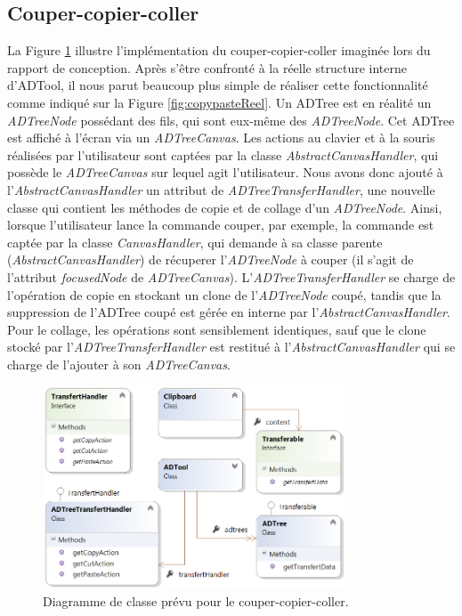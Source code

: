 	\subsection{Couper-copier-coller}
	La {\sc Figure} \ref{fig:copypastePrevu} illustre l'implémentation du couper-copier-coller imaginée lors du rapport de conception. Après s'être confronté à la réelle structure interne d'ADTool, il nous parut beaucoup plus simple de réaliser cette fonctionnalité comme indiqué sur la {\sc Figure} \ref{fig:copypasteReel}. Un ADTree est en réalité un \emph{ADTreeNode} possédant des fils, qui sont eux-même des \emph{ADTreeNode}. Cet ADTree est affiché à l'écran via un \emph{ADTreeCanvas}. Les actions au clavier et à la souris réalisées par l'utilisateur sont captées par la classe \emph{AbstractCanvasHandler}, qui possède le \emph{ADTreeCanvas} sur lequel agit l'utilisateur. Nous avons donc ajouté à l'\emph{AbstractCanvasHandler} un attribut de \emph{ADTreeTransferHandler}, une nouvelle classe qui contient les méthodes de copie et de collage d'un \emph{ADTreeNode}. Ainsi, lorsque l'utilisateur lance la commande couper, par exemple, la commande est captée par la classe \emph{CanvasHandler}, qui demande à sa classe parente (\emph{AbstractCanvasHandler}) de récuperer l'\emph{ADTreeNode} à couper (il s'agit de l'attribut \emph{focusedNode} de \emph{ADTreeCanvas}). L'\emph{ADTreeTransferHandler} se charge de l'opération de copie en stockant un clone de l'\emph{ADTreeNode} coupé, tandis que la suppression de l'ADTree coupé est gérée en interne par l'\emph{AbstractCanvasHandler}. Pour le collage, les opérations sont sensiblement identiques, sauf que le clone stocké par l'\emph{ADTreeTransferHandler} est restitué à l'\emph{AbstractCanvasHandler} qui se charge de l'ajouter à son \emph{ADTreeCanvas}.
	
	
		\begin{figure}
            \centering
                \includegraphics[width=0.8\textwidth]{figure/copiercoller.png}
            \caption{Diagramme de classe prévu pour le couper-copier-coller.}
            \label{fig:copypastePrevu}
        \end{figure}
        

